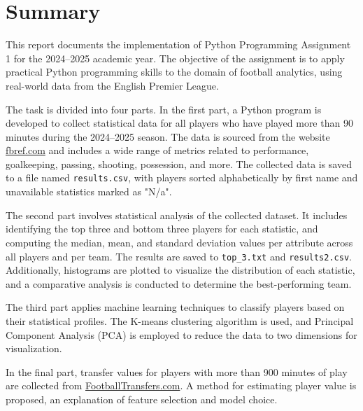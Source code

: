\documentclass[12pt,a4paper]{report}
\begin{document}
\setlength{\parindent}{0em}  %
\setlength{\parskip}{1em}    %

\cleardoublepage  %
\chapter*{Summary}  %
This report documents the implementation of Python Programming Assignment 1 for the 2024--2025 academic year. The objective of the assignment is to apply practical Python programming skills to the domain of football analytics, using real-world data from the English Premier League.

The task is divided into four parts. In the first part, a Python program is developed to collect statistical data for all players who have played more than 90 minutes during the 2024--2025 season. The data is sourced from the website \href{https://fbref.com}{fbref.com} and includes a wide range of metrics related to performance, goalkeeping, passing, shooting, possession, and more. The collected data is saved to a file named \texttt{results.csv}, with players sorted alphabetically by first name and unavailable statistics marked as "N/a".

The second part involves statistical analysis of the collected dataset. It includes identifying the top three and bottom three players for each statistic, and computing the median, mean, and standard deviation values per attribute across all players and per team. The results are saved to \texttt{top\_3.txt} and \texttt{results2.csv}. Additionally, histograms are plotted to visualize the distribution of each statistic, and a comparative analysis is conducted to determine the best-performing team.

The third part applies machine learning techniques to classify players based on their statistical profiles. The K-means clustering algorithm is used, and Principal Component Analysis (PCA) is employed to reduce the data to two dimensions for visualization.

In the final part, transfer values for players with more than 900 minutes of play are collected from \href{https://footballtransfers.com}{FootballTransfers.com}. A method for estimating player value is proposed, an explanation of feature selection and model choice.
\end{document}
